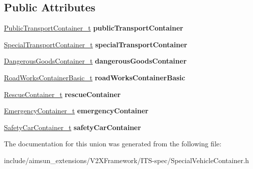\subsection*{Public Attributes}
\begin{DoxyCompactItemize}
\item 
\hyperlink{structPublicTransportContainer}{Public\+Transport\+Container\+\_\+t} {\bfseries public\+Transport\+Container}\hypertarget{unionSpecialVehicleContainer_1_1SpecialVehicleContainer__u_aeca69ba8282e499ddfc3b91f01e86c04}{}\label{unionSpecialVehicleContainer_1_1SpecialVehicleContainer__u_aeca69ba8282e499ddfc3b91f01e86c04}

\item 
\hyperlink{structSpecialTransportContainer}{Special\+Transport\+Container\+\_\+t} {\bfseries special\+Transport\+Container}\hypertarget{unionSpecialVehicleContainer_1_1SpecialVehicleContainer__u_a7772333d2824abbfe53bbee84d2cd299}{}\label{unionSpecialVehicleContainer_1_1SpecialVehicleContainer__u_a7772333d2824abbfe53bbee84d2cd299}

\item 
\hyperlink{structDangerousGoodsContainer}{Dangerous\+Goods\+Container\+\_\+t} {\bfseries dangerous\+Goods\+Container}\hypertarget{unionSpecialVehicleContainer_1_1SpecialVehicleContainer__u_aa16e0b16240e543510c131fd3ce3525c}{}\label{unionSpecialVehicleContainer_1_1SpecialVehicleContainer__u_aa16e0b16240e543510c131fd3ce3525c}

\item 
\hyperlink{structRoadWorksContainerBasic}{Road\+Works\+Container\+Basic\+\_\+t} {\bfseries road\+Works\+Container\+Basic}\hypertarget{unionSpecialVehicleContainer_1_1SpecialVehicleContainer__u_af9abd7ed474403787766a21f828ba30e}{}\label{unionSpecialVehicleContainer_1_1SpecialVehicleContainer__u_af9abd7ed474403787766a21f828ba30e}

\item 
\hyperlink{structRescueContainer}{Rescue\+Container\+\_\+t} {\bfseries rescue\+Container}\hypertarget{unionSpecialVehicleContainer_1_1SpecialVehicleContainer__u_ac6a7a0de5049f874e3edd38b7b94d969}{}\label{unionSpecialVehicleContainer_1_1SpecialVehicleContainer__u_ac6a7a0de5049f874e3edd38b7b94d969}

\item 
\hyperlink{structEmergencyContainer}{Emergency\+Container\+\_\+t} {\bfseries emergency\+Container}\hypertarget{unionSpecialVehicleContainer_1_1SpecialVehicleContainer__u_a2d3f91e281936dee075ef92cc1ecbfbf}{}\label{unionSpecialVehicleContainer_1_1SpecialVehicleContainer__u_a2d3f91e281936dee075ef92cc1ecbfbf}

\item 
\hyperlink{structSafetyCarContainer}{Safety\+Car\+Container\+\_\+t} {\bfseries safety\+Car\+Container}\hypertarget{unionSpecialVehicleContainer_1_1SpecialVehicleContainer__u_ab213fb8d2d0373854520b8a1a8eac596}{}\label{unionSpecialVehicleContainer_1_1SpecialVehicleContainer__u_ab213fb8d2d0373854520b8a1a8eac596}

\end{DoxyCompactItemize}


The documentation for this union was generated from the following file\+:\begin{DoxyCompactItemize}
\item 
include/aimsun\+\_\+extensions/\+V2\+X\+Framework/\+I\+T\+S-\/spec/Special\+Vehicle\+Container.\+h\end{DoxyCompactItemize}
